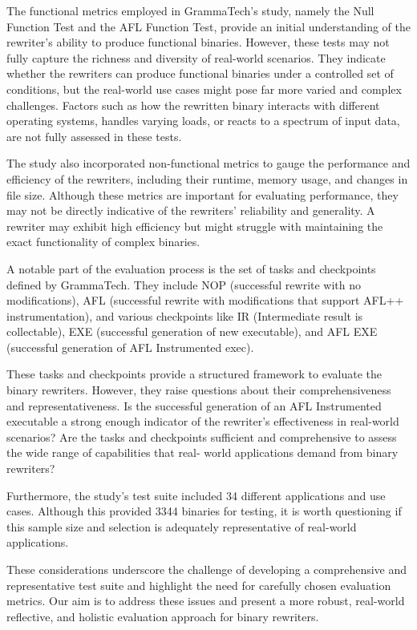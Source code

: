 \documentclass[a4paper,11pt,oneside]{report}
\begin{document}
The functional metrics employed in GrammaTech's study, namely the Null Function
Test and the AFL Function Test, provide an initial understanding of the rewriter's ability to
produce functional binaries. However, these tests may not fully capture the richness and
diversity of real-world scenarios. They indicate whether the rewriters can produce
functional binaries under a controlled set of conditions, but the real-world use cases might
pose far more varied and complex challenges. Factors such as how the rewritten binary
interacts with different operating systems, handles varying loads, or reacts to a spectrum of
input data, are not fully assessed in these tests.

The study also incorporated non-functional metrics to gauge the performance and
efficiency of the rewriters, including their runtime, memory usage, and changes in file size.
Although these metrics are important for evaluating performance, they may not be directly
indicative of the rewriters' reliability and generality. A rewriter may exhibit high efficiency
but might struggle with maintaining the exact functionality of complex binaries.

A notable part of the evaluation process is the set of tasks and checkpoints defined
by GrammaTech. They include NOP (successful rewrite with no modifications), AFL
(successful rewrite with modifications that support AFL++ instrumentation), and various
checkpoints like IR (Intermediate result is collectable), EXE (successful generation of new
executable), and AFL EXE (successful generation of AFL Instrumented exec).

These tasks and checkpoints provide a structured framework to evaluate the binary
rewriters. However, they raise questions about their comprehensiveness and
representativeness. Is the successful generation of an AFL Instrumented executable a strong
enough indicator of the rewriter's effectiveness in real-world scenarios? Are the tasks and
checkpoints sufficient and comprehensive to assess the wide range of capabilities that real-
world applications demand from binary rewriters?

Furthermore, the study's test suite included 34 different applications and use cases.
Although this provided 3344 binaries for testing, it is worth questioning if this sample size
and selection is adequately representative of real-world applications.

These considerations underscore the challenge of developing a comprehensive and
representative test suite and highlight the need for carefully chosen evaluation metrics. Our
aim is to address these issues and present a more robust, real-world reflective, and holistic
evaluation approach for binary rewriters.
\end{document}
